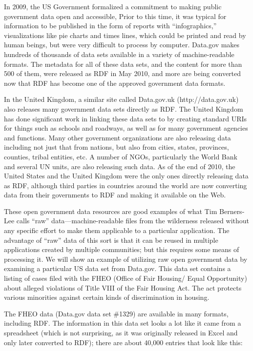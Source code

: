 In 2009, the US Government formalized a commitment to making public
government data open and accessible, Prior to this time, it was typical
for information to be published in the form of reports with
``infographics,'' visualizations like pie charts and times lines, which
could be printed and read by human beings, but were very difficult to
process by computer. Data.gov makes hundreds of thousands of data sets
available in a variety of machine-readable formats. The metadata for all
of these data sets, and the content for more than 500 of them, were
released as RDF in May 2010, and more are being converted now that RDF
has become one of the approved government data formats.

In the United Kingdom, a similar site called Data.gov.uk
(http://data.gov.uk) also releases many government data sets directly as
RDF. The United Kingdom has done significant work in linking these data
sets to by creating standard URIs for things such as schools and
roadways, as well as for many government agencies and functions. Many
other government organizations are also releasing data including not
just that from nations, but also from cities, states, provinces,
counties, tribal entities, etc. A number of NGOs, particularly the World
Bank and several UN units, are also releasing such data. As of the end
of 2010, the United States and the United Kingdom were the only ones
directly releasing data as RDF, although third parties in countries
around the world are now converting data from their governments to RDF
and making it available on the Web.

These open government data resources are good examples of what Tim
Berners-Lee calls ``raw'' data---machine-readable files from the
wilderness released without any specific effort to make them applicable
to a particular application. The advantage of ``raw'' data of this sort
is that it can be reused in multiple applications created by multiple
communities; but this requires some means of processing it. We will show
an example of utilizing raw open government data by examining a
particular US data set from Data.gov. This data set contains a listing
of cases filed with the FHEO (Office of Fair Housing/ Equal Opportunity)
about alleged violations of Title VIII of the Fair Housing Act. The act
protects various minorities against certain kinds of discrimination in
housing.

The FHEO data (Data.gov data set \#1329) are available in many formats,
including RDF. The information in this data set looks a lot like it came
from a spreadsheet (which is not surprising, as it was originally
released in Excel and only later converted to RDF); there are about
40,000 entries that look like this:

